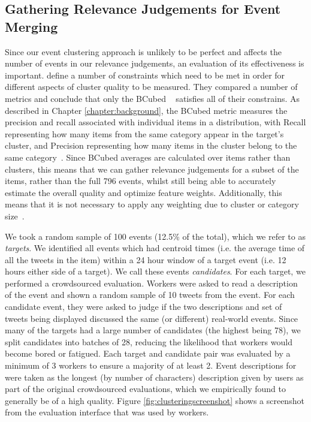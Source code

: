 \subsection{Gathering Relevance Judgements for Event Merging}
\label{sec:clustering}
\label{collection:sec:eval}
Since our event clustering approach is unlikely to be perfect and affects the number of events in our relevance judgements, an evaluation of its effectiveness is important.
\cite{Amigo:2009:CEC:1555682.1555686} define a number of constraints which need to be met in order for different aspects of cluster quality to be measured.
They compared a number of metrics and conclude that only the BCubed ~\citep{Bagga:1998:ECC:980845.980859} satisfies all of their constrains.
As described in Chapter \ref{chapter:background}, the BCubed metric measures the precision and recall associated with individual items in a distribution, with Recall representing how many items from the same category appear in the target's cluster, and Precision representing how many items in the cluster belong to the same category~\citep{Amigo:2009:CEC:1555682.1555686}.
Since BCubed averages are calculated over items rather than clusters, this means that we can gather relevance judgements for a subset of the items, rather than the full 796 events, whilst still being able to accurately estimate the overall quality and optimize feature weights.
Additionally, this means that it is not necessary to apply any weighting due to cluster or category size~\citep{Amigo:2009:CEC:1555682.1555686}.

We took a random sample of 100 events (12.5\% of the total), which we refer to as \emph{targets}.
We identified all events which had centroid times (i.e. the average time of all the tweets in the item) within a 24 hour window of a target event (i.e. 12 hours either side of a target).
We call these events \emph{candidates}.
For each target, we performed a crowdsourced evaluation.
Workers were asked to read a description of the event and shown a random sample of 10 tweets from the event.
For each candidate event, they were asked to judge if the two descriptions and set of tweets being displayed discussed the same (or different) real-world events.
Since many of the targets had a large number of candidates (the highest being 78), we split candidates into batches of 28, reducing the likelihood that workers would become bored or fatigued.
Each target and candidate pair was evaluated by a minimum of 3 workers to ensure a majority of at least 2.
Event descriptions for were taken as the longest (by number of characters) description given by users as part of the original crowdsourced evaluations, which we empirically found to generally be of a high quality.
Figure \ref{fig:clusteringscreenshot} shows a screenshot from the evaluation interface that was used by workers.

